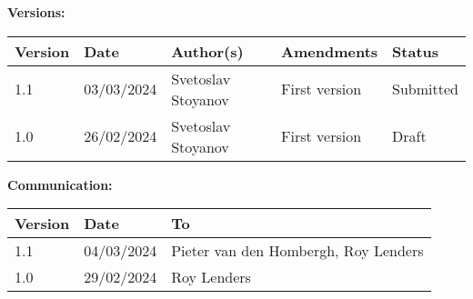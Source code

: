 \documentclass[12pt,a4paper]{article}
\begin{document}
\vspace{1em} %

\textbf{Versions:} 
\vspace{1em}

\begin{tabular}{|l|l|l|l|l|}
    \hline
    Version & Date & Author(s) & Amendments & Status \\
    \hline
    1.1 & 03/03/2024 & Svetoslav Stoyanov & First version & Submitted \\
    \hline
    1.0 & 26/02/2024 & Svetoslav Stoyanov & First version & Draft \\
    \hline
\end{tabular}

\vspace{1em} %

\textbf{Communication:} 
\vspace{1em} %

\begin{tabular}{|l|l|l|}
    \hline
    Version & Date & To \\
    \hline
    1.1 & 04/03/2024 & Pieter van den Hombergh, Roy Lenders \\
    \hline
    1.0 & 29/02/2024 & Roy Lenders \\
    \hline
\end{tabular}

\newpage

\tableofcontents

\newpage
\end{document}

